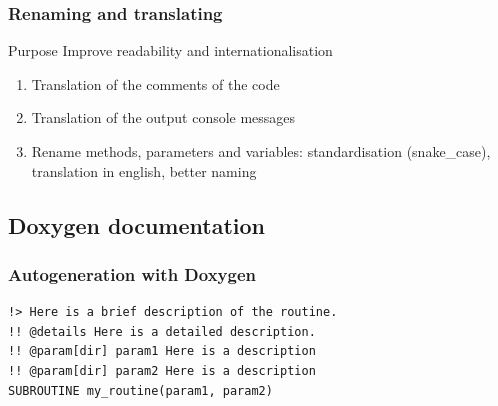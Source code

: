 \documentclass[10p]{beamer}
\begin{document}
\begin{frame}
\frametitle{Renaming and translating}
\begin{block}{Purpose}
Improve readability and internationalisation
\end{block}
\begin{enumerate}
\item Translation of the comments of the code
\item Translation of the output console messages
\item Rename methods, parameters and variables: standardisation (snake\_case), translation in english, better naming
\end{enumerate}
\end{frame}

\subsection{Doxygen documentation}
\begin{frame}[fragile]
\frametitle{Autogeneration with Doxygen}



\begin{example}
\begin{lstlisting}
!> Here is a brief description of the routine.
!! @details Here is a detailed description.
!! @param[dir] param1 Here is a description
!! @param[dir] param2 Here is a description
SUBROUTINE my_routine(param1, param2)
\end{lstlisting}
\end{example}
\end{frame}
\end{document}
